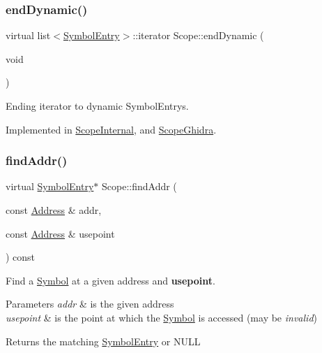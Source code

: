 \subsubsection{\texorpdfstring{endDynamic()}{endDynamic()}\hspace{0.1cm}{\footnotesize\ttfamily [2/2]}}
{\footnotesize\ttfamily virtual list$<$\mbox{\hyperlink{class_symbol_entry}{Symbol\+Entry}}$>$\+::iterator Scope\+::end\+Dynamic (\begin{DoxyParamCaption}\item[{void}]{ }\end{DoxyParamCaption})\hspace{0.3cm}{\ttfamily [pure virtual]}}



Ending iterator to dynamic Symbol\+Entrys. 



Implemented in \mbox{\hyperlink{class_scope_internal_a705f7003cbadcddbb621b951573c61e7}{Scope\+Internal}}, and \mbox{\hyperlink{class_scope_ghidra_abeb947fec06dcffbf611e30686a37657}{Scope\+Ghidra}}.

\mbox{\label{class_scope_aae4ea61f9a55ddfc9defd8548654c8e5}} 
\subsubsection{\texorpdfstring{findAddr()}{findAddr()}}
{\footnotesize\ttfamily virtual \mbox{\hyperlink{class_symbol_entry}{Symbol\+Entry}}$\ast$ Scope\+::find\+Addr (\begin{DoxyParamCaption}\item[{const \mbox{\hyperlink{class_address}{Address}} \&}]{addr,  }\item[{const \mbox{\hyperlink{class_address}{Address}} \&}]{usepoint }\end{DoxyParamCaption}) const\hspace{0.3cm}{\ttfamily [pure virtual]}}



Find a \mbox{\hyperlink{class_symbol}{Symbol}} at a given address and {\bfseries{usepoint}}. 


\begin{DoxyParams}{Parameters}
{\em addr} & is the given address \\
\hline
{\em usepoint} & is the point at which the \mbox{\hyperlink{class_symbol}{Symbol}} is accessed (may be {\itshape invalid}) \\
\hline
\end{DoxyParams}
\begin{DoxyReturn}{Returns}
the matching \mbox{\hyperlink{class_symbol_entry}{Symbol\+Entry}} or N\+U\+LL 
\end{DoxyReturn}


